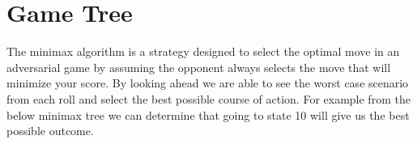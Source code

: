 \documentclass[
	12pt, %
]{fphw}
\begin{document}
\pagebreak

\section*{Game Tree}

\quad \quad The minimax algorithm is a strategy designed to select the optimal move in an adversarial game by assuming the opponent always selects the move that
will minimize your score. By looking ahead we are able to see the worst case scenario from each roll and select the best possible course of action. For example from the
below minimax tree we can determine that going to state 10 will give us the best possible outcome.


\end{document}
